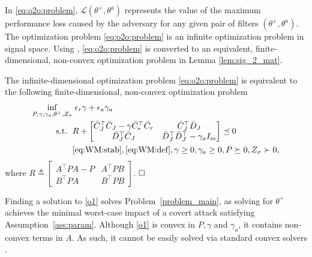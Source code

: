 In \eqref{eq:o2o:problem}, $\mathcal{L}(\theta^+,\theta^a)$ represents the value of the maximum performance loss caused by the adversary for any given pair of filters $(\theta^+,\theta^a)$.
The optimization problem \eqref{eq:o2o:problem} is an infinite optimization problem in signal space. Using \cite[Lem 3.1, Lem 3.2]{anand2023risk}, \eqref{eq:o2o:problem} is converted to an equivalent, finite-dimensional, non-convex optimization problem in Lemma \ref{lem:sig_2_mat}.
\begin{lemma}\label{lem:sig_2_mat}
The infinite-dimensional optimization problem \eqref{eq:o2o:problem} is equivalent to the following finite-dimensional, non-convex optimization problem
\begin{equation}\label{o1}
\begin{aligned}
\inf_{P,\gamma,\gamma_a,\theta^+,Z_\sigma} & \;\epsilon_r\gamma +\epsilon_a\gamma_a \\
\mathrm{s.t.} \;~ & R+\begin{bmatrix}
    \bar{C}_J^\top \bar{C}_J-\gamma \bar{C}_r^\top \bar{C}_r & \bar{C}_J^\top \bar{D}_J\\
    \bar{D}_J^\top \bar{C}_J & \bar{D}_J^\top \bar{D}_J^\top -\gamma_aI_{m}
\end{bmatrix} \preceq 0\\
& \eqref{eq:WM:stab}, \eqref{eq:WM:def}, \gamma \geq 0, \gamma_a \geq 0, P \succeq 0, Z_\sigma \succ 0,
\end{aligned}
\end{equation} 
where %
$R \triangleq \begin{bmatrix}
    A^\top PA-P & A^\top PB\\B^\top PA & B^\top PB
\end{bmatrix}$.
$\hfill \square$  
\end{lemma}
Finding a solution to \eqref{o1} solves Problem~\ref{problem_main}, as solving for $\theta^+$ achieves the minimal worst-case impact of a covert attack satisfying Assumption~\ref{ass:param}. Although \eqref{o1} is convex in $P,\gamma$ and $\gamma_a$, it contains non-convex terms in $A$.
As such, it cannot be easily solved via standard convex solvers \citep{lofberg2004yalmip}. %

